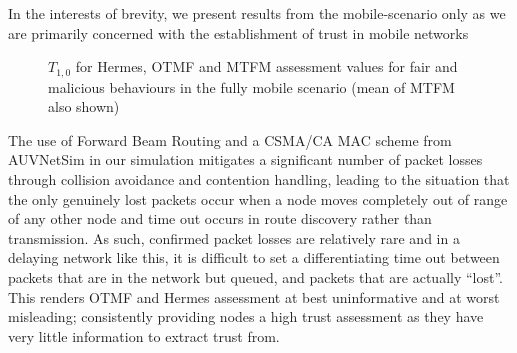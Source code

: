 \documentclass[conference]{IEEEtran}
\begin{document}
In the interests of brevity, we present results from the mobile-scenario only as we are primarily concerned with the establishment of trust in mobile networks
%
\begin{figure}[h]
  \newline
  \centering
\caption{$T_{1,0}$ for Hermes, OTMF and MTFM assessment values for fair and malicious behaviours in the fully mobile scenario (mean of MTFM also shown)}
\label{fig:otmf_beta_comparison}
\end{figure}
%
The use of Forward Beam Routing and a CSMA/CA MAC scheme from AUVNetSim \cite{Miquel2008} in our simulation mitigates a significant number of packet losses through collision avoidance and contention handling, leading to the situation that the only genuinely lost packets occur when a node moves completely out of range of any other node and time out occurs in route discovery rather than transmission.
As such, confirmed packet losses are relatively rare and in a delaying network like this, it is difficult to set a differentiating time out between packets that are in the network but queued, and packets that are actually ``lost''.
This renders OTMF and Hermes assessment at best uninformative and at worst misleading; consistently providing nodes a high trust assessment as they have very little information to extract trust from. 
\end{document}
